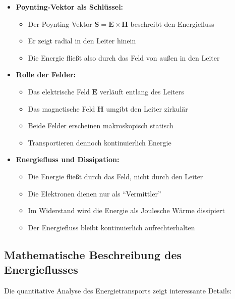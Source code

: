 \documentclass[12pt,a4paper]{article}
\begin{document}
\begin{itemize}
    \item \textbf{Poynting-Vektor als Schlüssel:}
    \begin{itemize}
        \item Der Poynting-Vektor \( \mathbf{S} = \mathbf{E} \times \mathbf{H} \) beschreibt den Energiefluss
        \item Er zeigt radial in den Leiter hinein
        \item Die Energie fließt also durch das Feld von außen in den Leiter
    \end{itemize}

    \item \textbf{Rolle der Felder:}
    \begin{itemize}
        \item Das elektrische Feld \( \mathbf{E} \) verläuft entlang des Leiters
        \item Das magnetische Feld \( \mathbf{H} \) umgibt den Leiter zirkulär
        \item Beide Felder erscheinen makroskopisch statisch
        \item Transportieren dennoch kontinuierlich Energie
    \end{itemize}

    \item \textbf{Energiefluss und Dissipation:}
    \begin{itemize}
        \item Die Energie fließt durch das Feld, nicht durch den Leiter
        \item Die Elektronen dienen nur als ``Vermittler''
        \item Im Widerstand wird die Energie als Joulesche Wärme dissipiert
        \item Der Energiefluss bleibt kontinuierlich aufrechterhalten
    \end{itemize}
\end{itemize}

\subsection{Mathematische Beschreibung des Energieflusses}
Die quantitative Analyse des Energietransports zeigt interessante Details:
\end{document}
